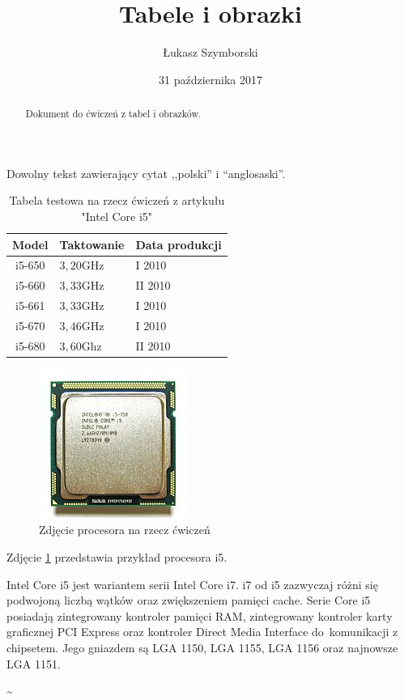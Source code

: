 \documentclass[a4paper,12pt]{article}
\title{Tabele i obrazki}
\author{Łukasz Szymborski}
\date{31 października 2017}
\begin{document}
%
\maketitle

\begin{abstract}
Dokument do ćwiczeń z tabel i obrazków.
\end{abstract}
%
\centering Dowolny tekst zawierający cytat ,,polski'' i ``anglosaski''.
%
\begin{table}[h]
\centering
\begin{tabular}{c|l|l}
Model & Taktowanie & Data produkcji \\
\hline
i5-650 & $3,20$GHz & I 2010 \\
\hline
i5-660 & $3,33$GHz & II 2010 \\
\hline
i5-661 & $3,33$GHz & I 2010 \\
\hline
i5-670 & $3,46$GHz & I 2010 \\
\hline
i5-680 & $3,60$Ghz & II 2010 \\
\end{tabular}
\caption {Tabela testowa na rzecz ćwiczeń z artykułu "Intel Core i5"}
\end{table}

\begin{figure}[h]
\centering
\includegraphics[bb=0 0 185 185]{Intel_Core_i5.jpg}
\caption{Zdjęcie procesora na rzecz ćwiczeń}
\label{fig:cpu}
\end{figure}
%
Zdjęcie \ref{fig:cpu} przedstawia przykład procesora i5.
%
\begin{flushleft}
Intel Core i5 jest wariantem serii Intel Core i7. i7 od i5 zazwyczaj różni się podwojoną liczbą wątków oraz zwiększeniem pamięci cache. Serie Core i5 posiadają zintegrowany kontroler pamięci RAM, zintegrowany kontroler karty graficznej PCI Express oraz kontroler Direct Media Interface do~komunikacji z chipsetem. Jego gniazdem są LGA 1150, LGA 1155, LGA 1156 oraz najnowsze LGA 1151.

\textasciitilde
\end{flushleft}
%
\end{document}
